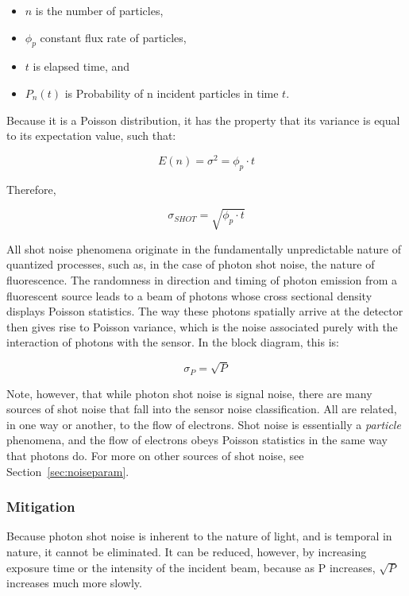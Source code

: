 \documentclass[10pt]{article}
\begin{document}
\begin{itemize}[noitemsep]
\item \textbf{\boldmath$n$} is the number of particles,
\item \textbf{\boldmath$\phi_p$} constant flux rate of particles,
\item \textbf{\boldmath$t$} is elapsed time, and
\item \textbf{\boldmath$P_n(t)$} is Probability of n incident particles in time $t$.
\end{itemize}

Because it is a Poisson distribution, it has the property that its variance is equal to its expectation value, such that:

$$E(n)=\sigma^2=\phi_p \cdot t$$

\noindent Therefore,

$$\sigma_{SHOT}=\sqrt{\phi_p \cdot t}$$

\vspace{0.4cm}

All shot noise phenomena originate in the fundamentally unpredictable nature of quantized processes, such as, in the case of photon shot noise, the nature of fluorescence. The randomness in direction and timing of photon emission from a fluorescent source leads to a beam of photons whose cross sectional density displays Poisson statistics. The way these photons spatially arrive at the detector then gives rise to Poisson variance, which is the noise associated purely with the interaction of photons with the sensor. In the block diagram, this is:

\vspace{0.2cm}

$$\sigma_P = \sqrt P$$

\vspace{2mm}

Note, however, that while photon shot noise is signal noise, there are many sources of shot noise that fall into the sensor noise classification. All are related, in one way or another, to the flow of electrons. Shot noise is essentially a \emph{particle} phenomena, and the flow of electrons obeys Poisson statistics in the same way that photons do. For more on other sources of shot noise, see Section~\ref{sec:noiseparam}.

\subsubsection{Mitigation} Because photon shot noise is inherent to the nature of light, and is temporal in nature, it cannot be eliminated. It can be reduced, however, by increasing exposure time or the intensity of the incident beam, because as P increases, $\sqrt P$ increases much more slowly.
\end{document}
